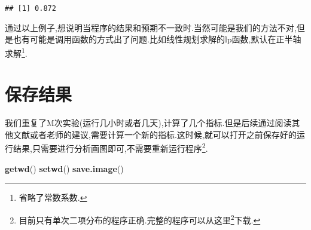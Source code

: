 \documentclass[]{ctexbook}
\newenvironment{Shaded}{\begin{snugshade}}{\end{snugshade}}
\newcommand{\DataTypeTok}[1]{\textcolor[rgb]{0.13,0.29,0.53}{#1}}
\newcommand{\DecValTok}[1]{\textcolor[rgb]{0.00,0.00,0.81}{#1}}
\newcommand{\FloatTok}[1]{\textcolor[rgb]{0.00,0.00,0.81}{#1}}
\newcommand{\KeywordTok}[1]{\textcolor[rgb]{0.13,0.29,0.53}{\textbf{#1}}}
\newcommand{\NormalTok}[1]{#1}
\newcommand{\OperatorTok}[1]{\textcolor[rgb]{0.81,0.36,0.00}{\textbf{#1}}}
\newcommand{\StringTok}[1]{\textcolor[rgb]{0.31,0.60,0.02}{#1}}
\renewcommand{\href}[2]{#2\footnote{\url{#1}}}
\begin{document}
\begin{Shaded}
\end{Shaded}

\begin{verbatim}
## [1] 0.872
\end{verbatim}

通过以上例子,想说明当程序的结果和预期不一致时.当然可能是我们的方法不对,但是也有可能是调用函数的方式出了问题.比如线性规划求解的lp函数,默认在正半轴求解\footnote{省略了常数系数.}.

\hypertarget{section-6}{%
\section{保存结果}\label{section-6}}

我们重复了M次实验(运行几小时或者几天),计算了几个指标.但是后续通过阅读其他文献或者老师的建议,需要计算一个新的指标.这时候,就可以打开之前保存好的运行结果,只需要进行分析画图即可,不需要重新运行程序\footnote{目前只有单次二项分布的程序正确.完整的程序可以从\href{code/glm.R}{这里}下载.}.

\begin{Shaded}
\begin{Highlighting}[]
\KeywordTok{getwd}\NormalTok{()}
\KeywordTok{setwd}\NormalTok{()}
\KeywordTok{save.image}\NormalTok{()}
\end{Highlighting}
\end{Shaded}
\end{document}
